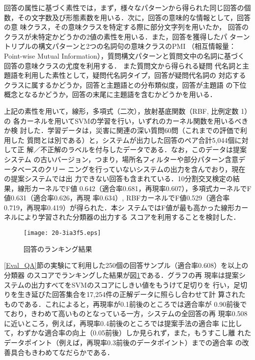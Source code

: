 \documentclass[japanese]{jnlp_1.4}
\begin{document}
回答の属性に基づく素性では，まず，様々なパターンから得られた同じ回答の個
数，その文字数及び形態素数を用いる．次に，回答の意味的な情報として，回答の意
味クラス，その意味クラスを特定する際に部分文字列を用いたか，
回答のクラスが未特定かどうかの2値の素性を用いる．また，回答を獲得したパ
ターントリプルの構文パターンと2つの名詞句の意味クラスのPMI （相互情報量：
Point-wise Mutual Information），質問構文パターンと質問文中の名詞に基づく回答の意味クラスの尤度\cite{De_Saeger2009}を利用する．
また質問文から得られる疑問
代名詞と主題語を利用した素性として，疑問代名詞タイプ，回答が疑問代名詞の
対応するクラスに属するかどうか，回答と主題語との分布類似度，回答が主題語
の下位概念となるかどうか，回答の末尾に主題語を含むかどうかを用いる．

上記の素性を用いて，線形，多項式（二次），放射基底関数（RBF, 比例定数 1）の
各カーネルを用いてSVMの学習を行い，いずれのカーネル関数を用いるべきか検
討した．学習データは，災害に関連の深い質問60問（これまでの評価で利用した
質問とは別である）と，システムが出力した回答のペア合計5,044個に対して正
解／不正解のラベルを付与したデータである．なお，このデータは提案システム
の古いバージョン，つまり，場所名フィルターや部分パターン含意データベースのクリー
ニングを行っていないシステムの出力を含んでおり，現在の提案システムでは出
力できない回答も含まれている．10分割交叉検定の結果，線形カーネルでF値
0.642（適合率0.681，再現率0.607），多項式カーネルでF値0.631（適合率0.626，再現
率0.634）, RBFカーネルでF値0.529（適合率0.719，再現率0.419）が得られた．本シ
ステムではF値が最も高かった線形カーネルにより学習された分類器の出力する
スコアを利用することを検討した．

\begin{figure}[b]
\begin{center}
\texttt{[image: 20-3ia3f5.eps]}
\end{center}
\caption{回答のランキング結果}
\label{recall_prec_pic}
\end{figure}

\ref{Eval_QA}節の実験にて利用した250個の回答サンプル（適合率0.608）を以上の分類器
のスコアでランキングした結果が図\ref{recall_prec_pic}である．グラフの再
現率は提案システムの出力すべてをSVMのスコアにしきい値をもうけて足切りを
行い，足切りを生き延びた回答集合を17,254件の正解データに照らし合わせて計
算されたものである．これによると，再現率が0.1前後のところでは適合率が
0.90前後でており，きわめて高いものとなっている一方，システムの全回答の再
現率0.508に近いところ，例えば，再現率0.4前後のところでは提案手法の適合率
に比して，わずかな適合率の向上（0.05前後）しか見られず，また，もうすこし離
れたデータポイント（例えば，再現率0.3前後のデータポイント）までの適合率
の改善具合もきわめてなだらかである．
\end{document}
